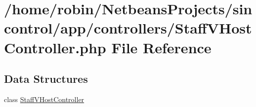 \hypertarget{_staff_v_host_controller_8php}{}\section{/home/robin/\+Netbeans\+Projects/sincontrol/app/controllers/\+Staff\+V\+Host\+Controller.php File Reference}
\label{_staff_v_host_controller_8php}
\subsection*{Data Structures}
\begin{DoxyCompactItemize}
\item 
class \hyperlink{class_staff_v_host_controller}{Staff\+V\+Host\+Controller}
\end{DoxyCompactItemize}
